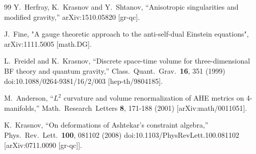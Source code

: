\documentclass[a4paper,12pt]{article}
\begin{document}
\begin{thebibliography}{99}
  Y.~Herfray, K.~Krasnov and Y.~Shtanov,
  ``Anisotropic singularities and modified gravity,''
  arXiv:1510.05820 [gr-qc].
  
   J.~Fine, "A gauge theoretic approach to the anti-self-dual Einstein equations", 	arXiv:1111.5005 [math.DG].
  
  L.~Freidel and K.~Krasnov,
  ``Discrete space-time volume for three-dimensional BF theory and quantum gravity,''
  Class.\ Quant.\ Grav.\  {\bf 16}, 351 (1999)
  doi:10.1088/0264-9381/16/2/003
  [hep-th/9804185].
  
 M.~Anderson, ``$L^2$ curvature and volume renormalization of AHE metrics on 4-manifolds,'' 
Math.\ Research\ Letters {\bf 8}, 171-188 (2001)
[arXiv:math/0011051].

  K.~Krasnov,
  ``On deformations of Ashtekar's constraint algebra,''
  Phys.\ Rev.\ Lett.\  {\bf 100}, 081102 (2008)
  doi:10.1103/PhysRevLett.100.081102
  [arXiv:0711.0090 [gr-qc]].


\end{thebibliography}
\end{document}

